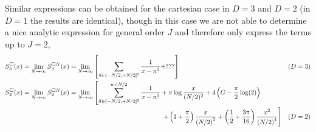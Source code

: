 Similar expressions can be obtained for the cartesian case in $D=3$ and $D=2$ (in $D=1$ the results are identical), though in this case we are not able to determine a nice analytic expression for general order $J$ and therefore only express the terms up to $J=2$,
\begin{align}
    S_3^\cartesian(x)  = \lim_{N\goesto\infty} S^{\cartesian N}_3(x)
    &=
    \lim_{N\goesto\infty}\left[\sum_{\vec{n} \in (-N/2, +N/2]^3} \frac{1}{x-n^2}
        + ???
    \right]
    &
    (D&=3)
    \nonumber\\
    S_2^\cartesian(x)  = \lim_{N\goesto\infty} S^{\cartesian N}_2(x)
    &=
    \lim_{N\goesto\infty}\left[\sum_{\vec{n} \in (-N/2, +N/2]^2}^{n<N/2} \frac{1}{x-n^2}
        + \pi \log \frac{x}{(N/2)^2}
        +4\left(G-\frac{\pi }{2}\log(2)\right)\right.\\
        &\hspace{5cm}\left.+\left(1+\frac{\pi}{2}\right)\frac{x}{\left(N/2\right)^2}+\left(\frac{1}{2}+\frac{3 \pi }{16}\right)\frac{x^2}{\left(N/2\right)^4}
    \right]
    &
    (D&=2)
\end{align}


\begin{center}
\end{center}

